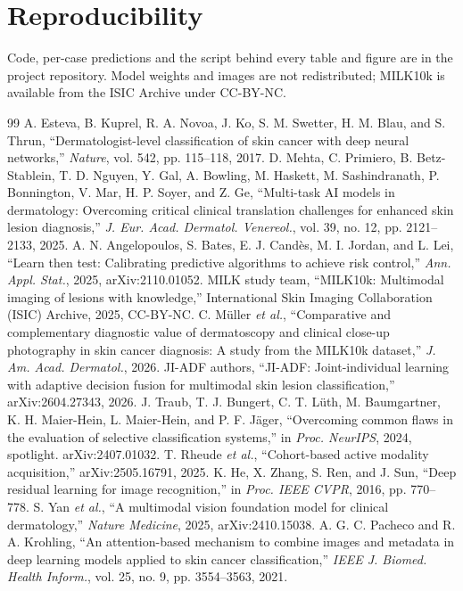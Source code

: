 \documentclass[conference]{IEEEtran}
\begin{document}
\section*{Reproducibility}
Code, per-case predictions and the script behind every table and figure are in the project repository. Model weights and images are not redistributed; MILK10k is available from the ISIC Archive under CC-BY-NC.

\begin{thebibliography}{99}
 A. Esteva, B. Kuprel, R. A. Novoa, J. Ko, S. M. Swetter, H. M. Blau, and S. Thrun, ``Dermatologist-level classification of skin cancer with deep neural networks,'' \textit{Nature}, vol. 542, pp. 115--118, 2017.
 D. Mehta, C. Primiero, B. Betz-Stablein, T. D. Nguyen, Y. Gal, A. Bowling, M. Haskett, M. Sashindranath, P. Bonnington, V. Mar, H. P. Soyer, and Z. Ge, ``Multi-task AI models in dermatology: Overcoming critical clinical translation challenges for enhanced skin lesion diagnosis,'' \textit{J. Eur. Acad. Dermatol. Venereol.}, vol. 39, no. 12, pp. 2121--2133, 2025.
 A. N. Angelopoulos, S. Bates, E. J. Cand\`es, M. I. Jordan, and L. Lei, ``Learn then test: Calibrating predictive algorithms to achieve risk control,'' \textit{Ann. Appl. Stat.}, 2025, arXiv:2110.01052.
 MILK study team, ``MILK10k: Multimodal imaging of lesions with knowledge,'' International Skin Imaging Collaboration (ISIC) Archive, 2025, CC-BY-NC.
 C. M\"uller \textit{et al.}, ``Comparative and complementary diagnostic value of dermatoscopy and clinical close-up photography in skin cancer diagnosis: A study from the MILK10k dataset,'' \textit{J. Am. Acad. Dermatol.}, 2026.
 JI-ADF authors, ``JI-ADF: Joint-individual learning with adaptive decision fusion for multimodal skin lesion classification,'' arXiv:2604.27343, 2026.
 J. Traub, T. J. Bungert, C. T. L\"uth, M. Baumgartner, K. H. Maier-Hein, L. Maier-Hein, and P. F. J\"ager, ``Overcoming common flaws in the evaluation of selective classification systems,'' in \textit{Proc. NeurIPS}, 2024, spotlight. arXiv:2407.01032.
 T. Rheude \textit{et al.}, ``Cohort-based active modality acquisition,'' arXiv:2505.16791, 2025.
 K. He, X. Zhang, S. Ren, and J. Sun, ``Deep residual learning for image recognition,'' in \textit{Proc. IEEE CVPR}, 2016, pp. 770--778.
 S. Yan \textit{et al.}, ``A multimodal vision foundation model for clinical dermatology,'' \textit{Nature Medicine}, 2025, arXiv:2410.15038.
 A. G. C. Pacheco and R. A. Krohling, ``An attention-based mechanism to combine images and metadata in deep learning models applied to skin cancer classification,'' \textit{IEEE J. Biomed. Health Inform.}, vol. 25, no. 9, pp. 3554--3563, 2021.

\end{thebibliography}
\end{document}
